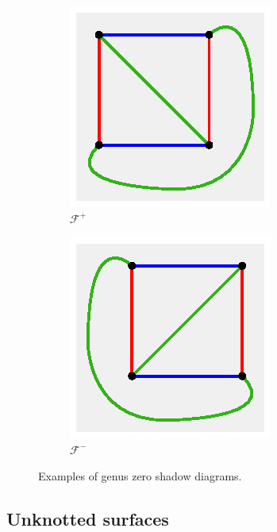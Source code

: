 \documentclass[11pt, oneside]{amsart}
\theoremstyle{theorem}
\theoremstyle{definition}
\newcommand{\F}{\mathcal{F}}
\theoremstyle{theorem}
\begin{document}
\begin{figure}[h!]
\begin{subfigure}{.5\textwidth}
  \centering
  \includegraphics[width=.5\linewidth]{rpplus.eps}
  \caption{$\F^+$}
  \label{rpp}
\end{subfigure}%
\begin{subfigure}{.5\textwidth}
  \centering
  \includegraphics[width=.5\linewidth]{rpminus.eps}
  \caption{$\F^-$}
  \label{rpm}
\end{subfigure}
\caption{Examples of genus zero shadow diagrams.}
\label{rpfigs}
\end{figure}

\subsection{Unknotted surfaces}\label{unkn}
\end{document}
